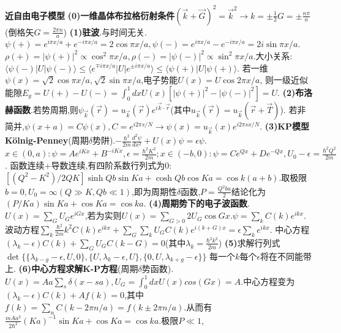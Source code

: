 \documentclass[UTF8,a4paper,10pt,twocolumn]{ctexart}
\begin{document}
  \textbf{近自由电子模型}
  \textbf{(0)一维晶体布拉格衍射条件}$(\vec{k}+\vec{G})^2=\vec{k}^2\rightarrow k=\pm\frac{1}{2}G=\pm\frac{n\pi}{a}$(倒格矢$G=\frac{2\pi n}{a}$)
  \textbf{(1)驻波}.与时间无关.$\psi(+)=e^{i\pi x/a}+e^{-i\pi x/a}=2\cos{\pi x/a},\psi(-)=e^{i\pi x/a}-e^{-i\pi x/a}=2i\sin{\pi x/a}$.
  $\rho(+)=|\psi(+)|^2\propto\cos^2{\pi x/a},\rho(-)=|\psi(-)|^2\propto\sin^2{\pi x/a}$.大小关系:$\langle\psi(-)|U|\psi(-)\rangle\leq\langle e^{\mp i\pi x/a}|U|e^{\pm i\pi x/a}\rangle\leq\langle\psi(+)|U|\psi(+)\rangle$.
  若一维$\psi(x)=\sqrt{2}\cos{\pi x/a},\sqrt{2}\sin{\pi x/a}$,电子势能$U(x)=U\cos{2\pi x/a}$,
  则一级近似能隙$E_g=U(+)-U(-)=\int_{0}^{1}dx U(x)[|\psi(+)|^2-|\psi(-)|^2]=U$.
  \textbf{(2)布洛赫函数}.若势周期,则$\psi_{\vec{k}}(\vec{r})=u_{\vec{k}}(\vec{r})e^{i\vec{k}\cdot\vec{r}}$(其中$u_{\vec{k}}(\vec{r})=u_{\vec{k}}(\vec{r}+\vec{T})$).
  若非简并,$\psi(x+a)=C\psi(x),C=e^{i2\pi s/N}\rightarrow\psi(x)=u_{\vec{k}}(x)e^{i2\pi sx/N}$.
  \textbf{(3)KP模型Kölnig-Penney}(周期$\delta$势阱).$-\frac{\hbar^2}{2m}\frac{d^2\psi}{dx^2}+U(x)\psi=\epsilon\psi$.
  $x\in(0,a):\psi=Ae^{iKx}+B^{-iKx},\epsilon=\frac{\hbar^2 K^2}{2m};x\in(-b,0):\psi=Ce^{Qx}+De^{-Qx},U_0-\epsilon=\frac{\hbar^2 Q^2}{2m}$.
  函数连续+导数连续,有四阶系数行列式为0:$[(Q^2-K^2)/2QK]\sinh{Qb}\sin{Ka}+\cosh{Qb}\cos{Ka}=\cos{k(a+b)}$.取极限$b=0,U_0=\infty(Q\gg K,Qb\ll 1)$,即为周期性$\delta$函数,$P=\frac{Q^2ba}{2}$结论化为$(P/Ka)\sin{Ka}+\cos{Ka}=\cos{ka}$.
  \textbf{(4)周期势下的电子波函数}.$U(x)=\sum_{G}U_{G}e^{iGx}$,若为实则$U(x)=\sum_{G>0}2U_G\cos{Gx}$.$\psi=\sum_{k}C(k)e^{ikx}$.
  波动方程$\sum_{k}\frac{\hbar^2}{2m}k^2C(k)e^{ikx}+\sum_{G}\sum_{k}U_G C(k)e^{i(k+G)x}=\epsilon\sum_{k}e^{ikx}$.
  中心方程$(\lambda_k-\epsilon)C(k)+\sum_{G}U_GC(k-G)=0$(其中$\lambda_k=\frac{\hbar^2 k^2}{2m}$)
  \textbf{(5)}求解行列式$\det\{\{\lambda_{k-g}-\epsilon,U,0\},\{U,\lambda_{k}-\epsilon,U\},\{0,U,\lambda_{k+g}-\epsilon\}\}$
  每一个$k$每个$\epsilon$将在不同能带上.
  \textbf{(6)中心方程求解K-P方程}(周期$\delta$势函数).$U(x)=Aa\sum_{s}\delta(x-sa),U_G=\int_0^{1}dxU(x)cos(Gx)=A.$中心方程变为$(\lambda_k-\epsilon)C(k)+Af(k)=0$,其中$f(k)=\sum_{n}C(k-2\pi n/a)=f(k\pm 2\pi n/a)$.从而有$\frac{mAa^2}{2\hbar^2}(Ka)^{-1}\sin{Ka}+\cos{Ka}=\cos{ka}$.极限$P\ll 1,$
\end{document}
